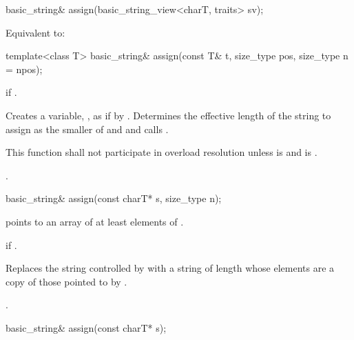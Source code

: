 %
\begin{itemdecl}
basic_string& assign(basic_string_view<charT, traits> sv);
\end{itemdecl}

\begin{itemdescr}
\pnum
\effects
Equivalent to: 
\end{itemdescr}

%
\begin{itemdecl}
template<class T>
  basic_string& assign(const T& t, size_type pos, size_type n = npos);
\end{itemdecl}

\begin{itemdescr}
\pnum
\throws
{}
if
.

\pnum
\effects
Creates a variable, , as if by .
Determines the effective length  of the string to assign
as the smaller of  and 
and calls .

\pnum
\remarks
This function shall not participate in overload resolution
unless 
is  and  is .

\pnum
\returns
{}.
\end{itemdescr}

%
\begin{itemdecl}
basic_string& assign(const charT* s, size_type n);
\end{itemdecl}

\begin{itemdescr}
\pnum
\requires {} points to an array of at least  elements of .

\pnum
\throws {} if .

\pnum
\effects Replaces the string controlled by  with a string
of length  whose elements are a copy of those pointed to by .

\pnum
\returns
{}.
\end{itemdescr}

%
\begin{itemdecl}
basic_string& assign(const charT* s);
\end{itemdecl}

